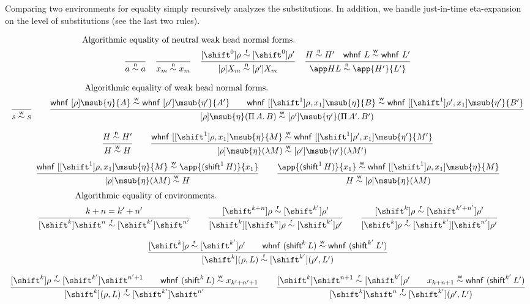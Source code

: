 \documentclass[copyright,creativecommons]{eptcs}
\makeatletter
\newcommand{\ru}[2]{\dfrac{\begin{array}[b]{@{}c@{}} #1 \end{array}}{#2}}
\newcommand{\shiftby}[1]{\shift^{#1}}
\newcommand{\esub}[1]{[#1]}
\newcommand{\msubp}[2]{\msub{#1}(#2)}
\newcommand{\dsub}[3]{\esub{#1}{\msub{#2}{#3}}} \newcommand{\dsubp}[3]{\esub{#1}{\msubp{#2}{#3}}} \newcommand{\fun}[1]{\Pi\,#1.\,}
\newcommand{\alr}{\buildrel\mathsf{r}\over\sim}\newcommand{\Alr}{(\mathord{\alr})}
\newcommand{\alreq}[4]{\shiftEnv{#1}{#3} \alr \shiftEnv{#2}{#4}}
\newcommand{\alw}{\buildrel\mathsf{w}\over\sim}\newcommand{\Alw}{(\mathord{\alw})}
\newcommand{\aln}{\buildrel\mathsf{n}\over\sim}\newcommand{\Aln}{(\mathord{\aln})}
\newcommand{\lift}[1]{\esub{\shiftby 1}{#1},x_1}
\newcommand{\twhnf}{\mathsf{whnf}}
\newcommand{\twhnfp}[1]{\twhnf~(#1)}
\newcommand{\whnf}[3]{\twhnf~\dsub{#1}{#2}{#3}}
\newcommand{\shiftEnv}[1]{\esub{\shiftby{#1}}}
\newcommand{\tshift}{\mathsf{shift}}
\newcommand{\shiftClos}[1]{\tshift^{#1}\,}
\newcommand{\shiftNe}{\shiftClos}
\makeatother
\begin{document}
Comparing two environments for equality simply recursively analyzes the
substitutions. In addition, we handle just-in-time
eta-expansion on the level of
substitutions (see the last two rules).

\begin{gather*}
\mbox{Algorithmic equality of neutral weak head normal forms.\hspace{6.5cm}}\\
  \ru{}{a \aln a}
\quad
  \ru{}{x_m \aln x_m}
\quad
  \ru{\alreq 0 0 \rho {\rho'}
    }{\esub \rho {X_m} \aln \esub {\rho'} {X_m}}
\quad
  \ru{H \aln H' \quad 
      \twhnf~ L \alw \twhnf~ L' 
    }{\app H L \aln \app {H'} {L'}}
\\[0.75em]
\mbox{Algorithmic equality of weak head normal forms.\hspace{7.5cm}}\\
  \ru{}{s \alw s}
\qquad
  \ru{\whnf \rho \eta A \alw \whnf {\rho'}{\eta'}{A'}
      \qquad
      \whnf {\lift\rho} \eta B \alw \whnf {\lift{\rho'}} {\eta'}{B'}
    }{\dsubp \rho \eta {\fun A B} \alw 
      \dsubp {\rho'}{\eta'}{\fun {A'}{B'}}}
\\[0.75em]
  \ru{H \aln H'  
    }{H \alw H}
\qquad
  \ru{\whnf {\lift\rho} \eta M \alw \whnf {\lift{\rho'}} {\eta'}{M'}
    }{\dsubp \rho \eta {\lambda M} \alw 
      \dsubp {\rho'}{\eta'}{\lambda M'}}
\end{gather*}
\begin{gather*}
\ru{\whnf {\lift\rho} \eta M \alw 
      \app{(\shiftNe 1 H)}{x_1}  
    }{\dsubp \rho \eta {\lambda M} \alw H}
\qquad
  \ru{\app{(\shiftNe 1 H)}{x_1}
      \alw \whnf {\lift\rho} \eta M 
    }{H \alw \dsubp \rho \eta {\lambda M}}
\end{gather*}
\begin{gather*}
\mbox{Algorithmic equality of environments.\hspace{10cm}}\\
  \ru{k + n = k' + n'
    }{\alreq k {k'}{\shiftby n}{\shiftby {n'}}}
\qquad
  \ru{\alreq{k+n}{k'}\rho{\rho'}
    }{\alreq k{k'}{\shiftEnv n \rho}{\rho'}}
\qquad
  \ru{\alreq{k}{k'+n'}\rho{\rho'}
    }{\alreq k{k'}{\rho}{\shiftEnv {n'}{\rho'}}}
\\[0.75em]
  \ru{\alreq k{k'}\rho{\rho'} \qquad
      \twhnfp{\shiftClos k L} \alw \twhnfp{\shiftClos {k'}{L'}}
    }{\alreq{k}{k'}{(\rho, L)}{(\rho', L')}}
\\[0.75em]
\ru{\alreq k {k'} \rho {\shiftby{n'+1}} \qquad
      \twhnfp{\shiftClos k L} \alw x_{k'+n'+1}
    }{\alreq k {k'} {(\rho, L)}{\shiftby {n'}}}
\qquad
  \ru{\alreq k {k'} {\shiftby{n+1}} {\rho'} \qquad
      x_{k+n+1} \alw \twhnfp{\shiftClos {k'} {L'}}
    }{\alreq k {k'} {\shiftby n}{(\rho', L')}}
\end{gather*}
\end{document}
